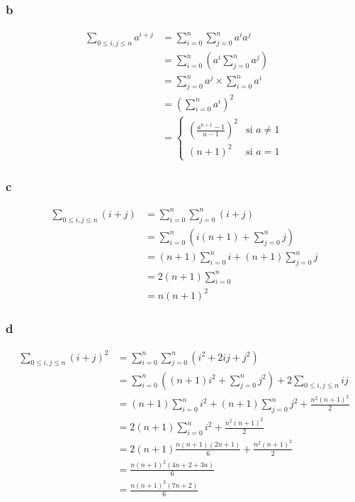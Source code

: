 \documentclass{report}
\begin{document}
\subsubsection*{b}
\begin{equation*}
	\begin{split}
		\sum_{0 \le i,j \le n} a^{i+j} &= \sum_{i=0}^{n} \sum_{j=0}^{n} a^i a^j \\
			&= \sum_{i=0}^{n} \left(a^i \sum_{j=0}^{n} a^j \right)\\
			&= \sum_{j=0}^{n} a^j \times \sum_{i=0}^{n} a^i \\
			&= \left(\sum_{i=0}^{n} a^i \right)^2 \\
			&= \begin{cases}
				\left(\frac{a^{n+1}-1}{a-1}\right)^2 & \text{si $a\neq 1$}\\
				(n+1)^2                                  & \text{si $a= 1$}
				\end{cases}          
	\end{split}
\end{equation*}

\subsubsection*{c}
\begin{equation*}
	\begin{split}
		\sum_{0 \le i,j \le n} (i+j) &= \sum_{i=0}^{n} \sum_{j=0}^{n} (i+j) \\
		&= \sum_{i=0}^{n} \left(i(n+1) + \sum_{j=0}^{n} j \right)\\
		&= (n+1) \sum_{i=0}^{n} i + (n+1)\sum_{j=0}^{n} j  \\
		&= 2(n+1) \sum_{i=0}^{n} \\
		&= n(n+1)^2
	\end{split}
\end{equation*}

\subsubsection*{d}
\begin{equation*}
	\begin{split}
		\sum_{0 \le i,j \le n} (i+j)^2 &= \sum_{i=0}^{n} \sum_{j=0}^{n} (i^2+2ij+j^2) \\
		&= \sum_{i=0}^{n} \left((n+1)i^2 + \sum_{j=0}^{n} j^2 \right) + 2\sum_{0 \le i,j \le n} ij\\
		&= (n+1) \sum_{i=0}^{n} i^2 + (n+1)\sum_{j=0}^{n} j^2 + \frac{n^2(n+1)^2}{2}  \\
		&= 2(n+1) \sum_{i=0}^{n} i^2 + \frac{n^2(n+1)^2}{2} \\
		&= 2(n+1)\frac{n(n+1)(2n+1)}{6} + \frac{n^2(n+1)^2}{2} \\
		&= \frac{n(n+1)^2(4n+2+3n)}{6} \\
		&= \frac{n(n+1)^2(7n+2)}{6}
	\end{split}
\end{equation*}
\end{document}
